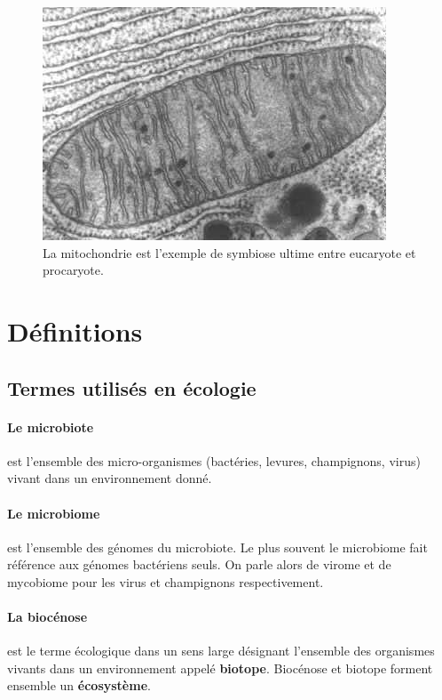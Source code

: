 \documentclass[12pt,a4paper]{article}
\begin{document}
\begin{figure}[ht]
\begin{center}
\includegraphics[scale=0.5]{img/mitochondrie.jpg}\hfill
\end{center}
\caption{La mitochondrie est l'exemple de symbiose ultime entre eucaryote et procaryote.}
\label{mitochondrie}
\end{figure}



\newpage

\section{Définitions}
\subsection{Termes utilisés en écologie}

\paragraph{Le microbiote\cite{Eisen}} est l’ensemble des micro-organismes (bactéries, levures, champignons, virus) vivant dans un environnement donné.
\paragraph{Le microbiome\cite{Eisen}} est l'ensemble des génomes du microbiote. Le plus souvent le microbiome fait référence aux génomes bactériens seuls. On parle alors de virome et de mycobiome pour les virus et champignons respectivement.

\paragraph{La biocénose} est le terme écologique dans un sens large désignant l'ensemble des organismes vivants dans un environnement appelé \textbf{biotope}. Biocénose et biotope forment ensemble un \textbf{écosystème}.
\end{document}
